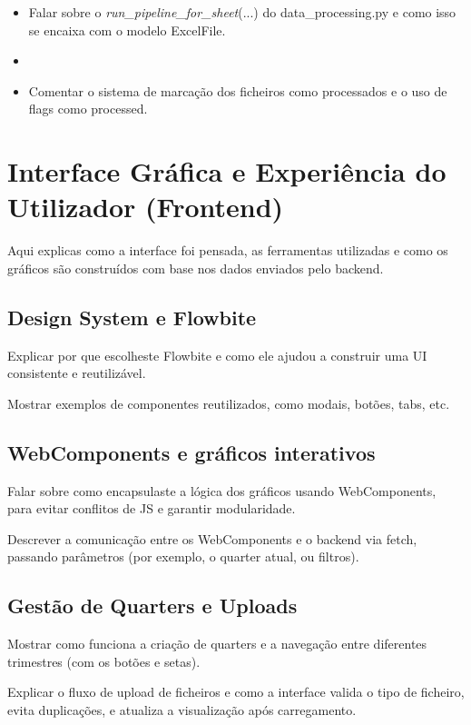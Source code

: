     \begin{itemize}
        \item Falar sobre o \textit{run_pipeline_for_sheet}(...) do data_processing.py e como isso se encaixa com o modelo ExcelFile.
        \item 
        \item Comentar o sistema de marcação dos ficheiros como processados e o uso de flags como processed.
    \end{itemize}



    \section{Interface Gráfica e Experiência do Utilizador (Frontend)}

Aqui explicas como a interface foi pensada, as ferramentas utilizadas e como os gráficos são construídos com base nos dados enviados pelo backend.
\subsection{Design System e Flowbite}

    Explicar por que escolheste Flowbite e como ele ajudou a construir uma UI consistente e reutilizável.

    Mostrar exemplos de componentes reutilizados, como modais, botões, tabs, etc.

\subsection{WebComponents e gráficos interativos}

    Falar sobre como encapsulaste a lógica dos gráficos usando WebComponents, para evitar conflitos de JS e garantir modularidade.

    Descrever a comunicação entre os WebComponents e o backend via fetch, passando parâmetros (por exemplo, o quarter atual, ou filtros).

\subsection{Gestão de Quarters e Uploads}

    Mostrar como funciona a criação de quarters e a navegação entre diferentes trimestres (com os botões e setas).

    Explicar o fluxo de upload de ficheiros e como a interface valida o tipo de ficheiro, evita duplicações, e atualiza a visualização após carregamento.

